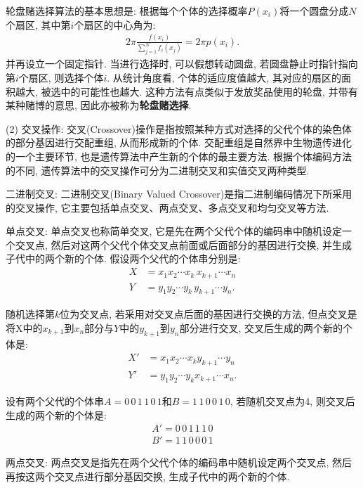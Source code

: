     轮盘赌选择算法的基本思想是: 根据每个个体的选择概率$P(x_i)$将一个圆盘分成$N$个扇区, 其中第$i$个扇区的中心角为:
\begin{align}
    2 \pi \frac{f\left(x_{i}\right)}{\sum_{j=1}^{N} f_{i}\left(x_{j}\right)}=2 \pi p\left(x_{i}\right).
\end{align}
并再设立一个固定指针. 当进行选择时, 可以假想转动圆盘, 若圆盘静止时指针指向第$i$个扇区, 则选择个体$i$.
从统计角度看, 个体的适应度值越大, 其对应的扇区的面积越大, 被选中的可能性也越大. 这种方法有点类似于发放奖品使用的轮盘, 并带有某种赌博的意思, 因此亦被称为\textbf{轮盘赌选择}.

(2) 交叉操作: 交叉(Crossover)操作是指按照某种方式对选择的父代个体的染色体的部分基因进行交配重组, 从而形成新的个体. 交配重组是自然界中生物遗传进化的一个主要环节, 也是遗传算法中产生新的个体的最主要方法. 根据个体编码方法的不同, 遗传算法中的交叉操作可分为二进制交叉和实值交叉两种类型.

     二进制交叉: 二进制交叉(Binary Valued Crossover)是指二进制编码情况下所采用的交叉操作, 它主要包括单点交叉、两点交叉、多点交叉和均匀交叉等方法.

     单点交叉: 单点交叉也称简单交叉, 它是先在两个父代个体的编码串中随机设定一个交叉点, 然后对这两个父代个体交叉点前面或后面部分的基因进行交换, 并生成子代中的两个新的个体. 假设两个父代的个体串分别是:
\begin{align}
    X&=x_1 x_2 \cdots x_k\, x_{k+1} \cdots x_n\\
    Y&=y_1 y_2 \cdots y_k\,  y_{k+1} \cdots y_n.
\end{align}

    随机选择第$k$位为交叉点, 若采用对交叉点后面的基因进行交换的方法, 但点交叉是将X中的$x_{k+1}$到$x_n$部分与$Y$中的$y_{k+1}$到$y_n$部分进行交叉, 交叉后生成的两个新的个体是:
\begin{align}
    X'&= x_1 x_2 \cdots x_k y_{k+1} \cdots y_n\\
    Y'&= y_1 y_2 \cdots y_k x_{k+1} \cdots x_n.
\end{align}
\begin{example}
设有两个父代的个体串$A=0\, 0\,  1\,  1\,  0\,  1$和$B=1\,  1\,  0\,  0\,  1\,  0$, 若随机交叉点为4, 则交叉后生成的两个新的个体是:
\begin{align}
    A'= 0\, 0\, 1\, 1\, 1\, 0\\
    B'= 1\, 1\, 0\, 0\, 0\, 1
\end{align}
\end{example}

     两点交叉: 两点交叉是指先在两个父代个体的编码串中随机设定两个交叉点, 然后再按这两个交叉点进行部分基因交换, 生成子代中的两个新的个体.

